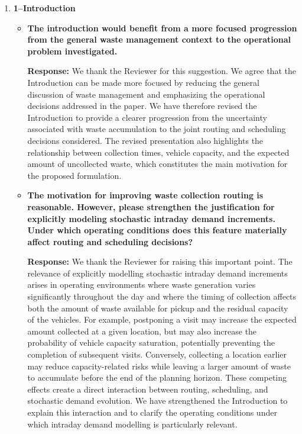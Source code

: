 \documentclass[11pt]{article}
\begin{document}
\begin{enumerate}
\item \textbf{1--Introduction}
\begin{itemize}
\item \textbf{The introduction would benefit from a more focused progression from the general waste
management context to the operational problem investigated.}


\noindent\textbf{Response:} We thank the Reviewer for this suggestion. We agree that the Introduction can be made more focused by reducing the general discussion of waste management and emphasizing the operational decisions addressed in the paper. We have therefore revised the Introduction to provide a clearer progression from the uncertainty associated with waste accumulation to the joint routing and scheduling decisions considered. The revised presentation also highlights the relationship between collection times, vehicle capacity, and the expected amount of uncollected waste, which constitutes the main motivation for the proposed formulation.



\item \textbf{The motivation for improving waste collection routing is reasonable. However, please
strengthen the justification for explicitly modeling stochastic intraday demand increments. Under which operating conditions does this feature materially affect routing and scheduling decisions?}


\noindent\textbf{Response:} We thank the Reviewer for raising this important point. The relevance of explicitly modelling stochastic intraday demand increments arises in operating environments where waste generation varies significantly throughout the day and where the timing of collection affects both the amount of waste available for pickup and the residual capacity of the vehicles. For example, postponing a visit may increase the expected amount collected at a given location, but may also increase the probability of vehicle capacity saturation, potentially preventing the completion of subsequent visits. Conversely, collecting a location earlier may reduce capacity-related risks while leaving a larger amount of waste to accumulate before the end of the planning horizon. These competing effects create a direct interaction between routing, scheduling, and stochastic demand evolution. We have strengthened the Introduction to explain this interaction and to clarify the operating conditions under which intraday demand modelling is particularly relevant.





\end{itemize}
\end{enumerate}
\end{document}
